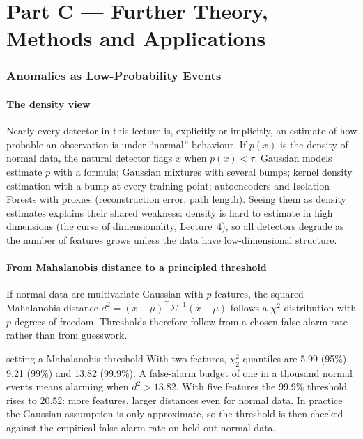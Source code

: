 \documentclass[11pt]{article}
\begin{document}
\clearpage
\part*{Part C --- Further Theory, Methods and Applications}

\section{Anomalies as Low-Probability Events}
\subsection{The density view}
Nearly every detector in this lecture is, explicitly or implicitly, an estimate of how probable an observation is under ``normal'' behaviour. If $p(x)$ is the density of normal data, the natural detector flags $x$ when $p(x)<\tau$. Gaussian models estimate $p$ with a formula; Gaussian mixtures with several bumps; kernel density estimation with a bump at every training point; autoencoders and Isolation Forests with proxies (reconstruction error, path length). Seeing them as density estimates explains their shared weakness: density is hard to estimate in high dimensions (the curse of dimensionality, Lecture~4), so all detectors degrade as the number of features grows unless the data have low-dimensional structure.

\subsection{From Mahalanobis distance to a principled threshold}
If normal data are multivariate Gaussian with $p$ features, the squared Mahalanobis distance $d^2=(x-\mu)^\top\Sigma^{-1}(x-\mu)$ follows a $\chi^2$ distribution with $p$ degrees of freedom. Thresholds therefore follow from a chosen false-alarm rate rather than from guesswork.
\begin{example}{setting a Mahalanobis threshold}
With two features, $\chi^2_2$ quantiles are 5.99 (95\%), 9.21 (99\%) and 13.82 (99.9\%). A false-alarm budget of one in a thousand normal events means alarming when $d^2>13.82$. With five features the 99.9\% threshold rises to 20.52: more features, larger distances even for normal data. In practice the Gaussian assumption is only approximate, so the threshold is then checked against the empirical false-alarm rate on held-out normal data.
\end{example}
\end{document}
